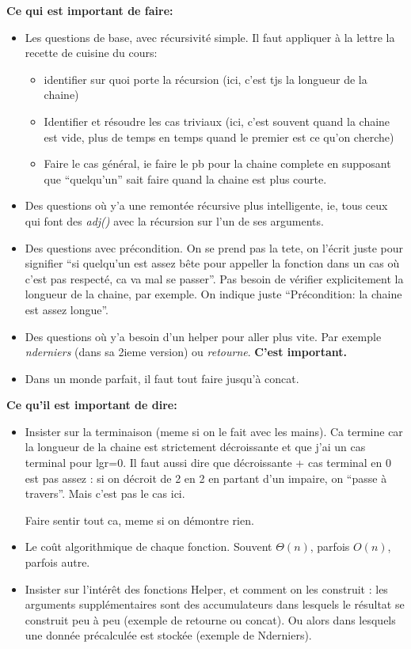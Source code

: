 \documentclass[10pt]{article}\usepackage[correction,nu]{esial}
\begin{document}
\begin{Reponse}
  \textbf{Ce qui est important de faire:}
  \begin{itemize}
  \item Les questions de base, avec récursivité simple. Il faut appliquer à la
    lettre la recette de cuisine du cours:
    \begin{itemize}
    \item identifier sur quoi porte la récursion (ici, c'est tjs la longueur de
      la chaine)
    \item Identifier et résoudre les cas triviaux (ici, c'est souvent quand la
      chaine est vide, plus de temps en temps quand le premier est ce qu'on
      cherche)
    \item Faire le cas général, ie faire le pb pour la chaine complete en
      supposant que ``quelqu'un'' sait faire quand la chaine est plus courte.
    \end{itemize}
  \item Des questions où y'a une remontée récursive plus intelligente, ie, tous
    ceux qui font des \textit{adj()} avec la récursion sur l'un de ses
    arguments.
  \item Des questions avec précondition. On se prend pas la tete, on l'écrit
    juste pour signifier ``si quelqu'un est assez bête pour appeller la
    fonction dans un cas où c'est pas respecté, ca va mal se passer''. Pas
    besoin de vérifier explicitement la longueur de la chaine, par exemple. On
    indique juste ``Précondition: la chaine est assez longue''.
  \item Des questions où y'a besoin d'un helper pour aller plus vite. Par
    exemple \textit{nderniers} (dans sa 2ieme version) ou
    \textit{retourne}. \textbf{C'est important.}
  \item Dans un monde parfait, il faut tout faire jusqu'à concat.
  \end{itemize}

  \textbf{Ce qu'il est important de dire:}
  \begin{itemize}
  \item Insister sur la terminaison (meme si on le fait avec les mains). Ca
    termine car la longueur de la chaine est strictement décroissante et que
    j'ai un cas terminal pour lgr=0. Il faut aussi dire que décroissante + cas
    terminal en 0 est pas assez : si on décroit de 2 en 2 en partant d'un
    impaire, on ``passe à travers''. Mais c'est pas le cas ici. 

    Faire sentir tout ca, meme si on démontre rien.
  \item Le coût algorithmique de chaque fonction. Souvent $\Theta(n)$, parfois
    $O(n)$, parfois autre.
  \item Insister sur l'intérêt des fonctions Helper, et comment on les
    construit : les arguments supplémentaires sont des accumulateurs dans
    lesquels le résultat se construit peu à peu (exemple de retourne ou
    concat). Ou alors dans lesquels une donnée précalculée est stockée (exemple
    de Nderniers).
  \end{itemize}


\end{Reponse}
\end{document}
